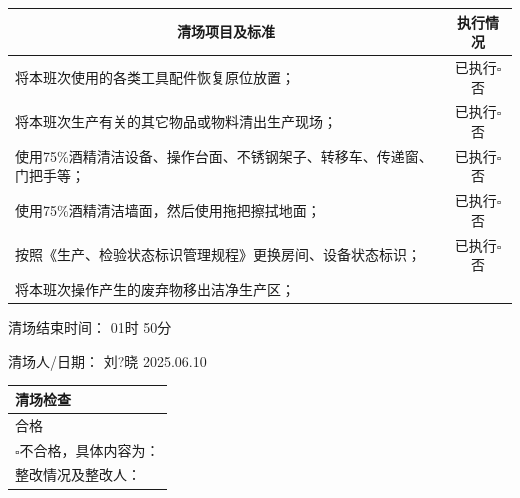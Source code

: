 \documentclass[UTF8,10pt,a4paper,fontset=fandol]{ctexart}
\newcommand{\fieldvalue}[1]{#1}
\newcommand{\handwritten}[1]{#1}
\begin{document}
\begin{tabularx}{\textwidth}{|X|c|}
\hline
\multicolumn{1}{|c|}{清场项目及标准} & 执行情况 \\
\hline
将本班次使用的各类工具配件恢复原位放置；
&
\fieldvalue{\handwritten{已执行}}\quad $\square$否 \\
\hline
将本班次生产有关的其它物品或物料清出生产现场；
&
\fieldvalue{\handwritten{已执行}}\quad $\square$否 \\
\hline
使用75\%酒精清洁设备、操作台面、不锈钢架子、转移车、传递窗、门把手等；
&
\fieldvalue{\handwritten{已执行}}\quad $\square$否 \\
\hline
使用75\%酒精清洁墙面，然后使用拖把擦拭地面；
&
\fieldvalue{\handwritten{已执行}}\quad $\square$否 \\
\hline
按照《生产、检验状态标识管理规程》更换房间、设备状态标识；
&
\fieldvalue{\handwritten{已执行}}\quad $\square$否 \\
\hline
将本班次操作产生的废弃物移出洁净生产区；
& \\
\hline
\end{tabularx}

清场结束时间：
\fieldvalue{\handwritten{01}}时
\fieldvalue{\handwritten{50}}分

清场人/日期：
\fieldvalue{\handwritten{刘?晓}}
\quad
\fieldvalue{\handwritten{2025.06.10}}

\begin{tabularx}{\textwidth}{|X|}
\hline
清场检查 \\
\hline
\fieldvalue{\handwritten{合格}} \\
\hline
$\square$不合格，具体内容为： \\
\hline
整改情况及整改人： \\
\hline
\end{tabularx}
\end{document}
